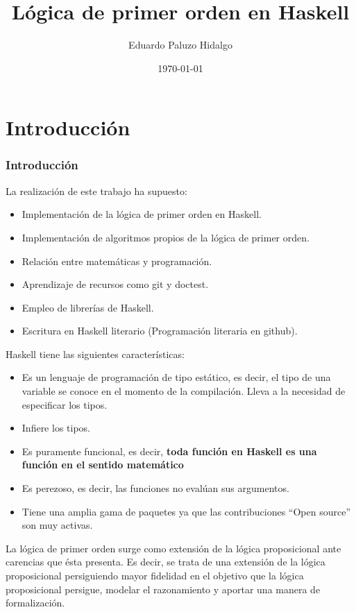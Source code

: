 \documentclass{beamer}
\title[LPO en Haskell]{Lógica de primer orden en Haskell}
\author[Eduardo P.]{Eduardo Paluzo Hidalgo}
\institute[US]{Universidad de Sevilla}
\date{\today}
\begin{document}
 
\frame{\titlepage}

\frame{\tableofcontents}
\section{Introducción}
\begin{frame}
  \frametitle{Introducción}
  La realización de este trabajo ha supuesto:
  \begin{itemize}
  \item Implementación de la lógica de primer orden en Haskell.
  \item Implementación de algoritmos propios de la lógica de primer orden.
  \item Relación entre matemáticas y programación.
  \item Aprendizaje de recursos como git y doctest.
  \item Empleo de librerías de Haskell.
  \item Escritura en Haskell literario (Programación literaria en github).
  \end{itemize}
\end{frame}


\begin{frame}
  Haskell tiene las siguientes características:

  \begin{itemize}
  \item Es un lenguaje de programación de tipo estático, es decir, el tipo de una variable
    se conoce en el momento de la compilación. Lleva a la necesidad de especificar los tipos. 
  \item Infiere los tipos.
  \item Es puramente funcional, es decir, \textbf{toda función en Haskell es una función en el sentido matemático}
  \item Es perezoso, es decir, las funciones no evalúan sus argumentos.
  \item Tiene una amplia gama de paquetes ya que las contribuciones ``Open source'' son muy activas. 
  \end{itemize}
\end{frame}

\begin{frame}
  La lógica de primer orden surge como extensión de la lógica proposicional ante carencias que ésta presenta. Es decir, se trata
  de una extensión de la lógica proposicional persiguiendo mayor fidelidad en el objetivo que la lógica proposicional
  persigue, modelar el razonamiento y aportar una manera de formalización.
  
\end{frame}
\end{document}

